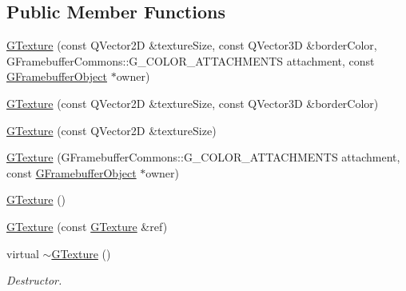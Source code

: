 \subsection*{Public Member Functions}
\begin{DoxyCompactItemize}
\item 
\mbox{\hyperlink{class_geometry_engine_1_1_geometry_buffer_1_1_g_texture_a1e4c62fd1d54f676f117ca11a90d55c5}{G\+Texture}} (const Q\+Vector2D \&texture\+Size, const Q\+Vector3D \&border\+Color, G\+Framebuffer\+Commons\+::\+G\+\_\+\+C\+O\+L\+O\+R\+\_\+\+A\+T\+T\+A\+C\+H\+M\+E\+N\+TS attachment, const \mbox{\hyperlink{class_geometry_engine_1_1_geometry_buffer_1_1_g_framebuffer_object}{G\+Framebuffer\+Object}} $\ast$owner)
\item 
\mbox{\hyperlink{class_geometry_engine_1_1_geometry_buffer_1_1_g_texture_a06caa47adf6c43699450c29212dab114}{G\+Texture}} (const Q\+Vector2D \&texture\+Size, const Q\+Vector3D \&border\+Color)
\item 
\mbox{\hyperlink{class_geometry_engine_1_1_geometry_buffer_1_1_g_texture_a8fa5f02d38154ba8642512e871a8edeb}{G\+Texture}} (const Q\+Vector2D \&texture\+Size)
\item 
\mbox{\hyperlink{class_geometry_engine_1_1_geometry_buffer_1_1_g_texture_add6fc3854f8fe8996fcd29de07d05646}{G\+Texture}} (G\+Framebuffer\+Commons\+::\+G\+\_\+\+C\+O\+L\+O\+R\+\_\+\+A\+T\+T\+A\+C\+H\+M\+E\+N\+TS attachment, const \mbox{\hyperlink{class_geometry_engine_1_1_geometry_buffer_1_1_g_framebuffer_object}{G\+Framebuffer\+Object}} $\ast$owner)
\item 
\mbox{\hyperlink{class_geometry_engine_1_1_geometry_buffer_1_1_g_texture_acfb10448d13cf57f11ed8a80b2a620dd}{G\+Texture}} ()
\item 
\mbox{\hyperlink{class_geometry_engine_1_1_geometry_buffer_1_1_g_texture_a6f0f5cdfdad0a20af7719c743375d678}{G\+Texture}} (const \mbox{\hyperlink{class_geometry_engine_1_1_geometry_buffer_1_1_g_texture}{G\+Texture}} \&ref)
\item 
\mbox{\label{class_geometry_engine_1_1_geometry_buffer_1_1_g_texture_a6ce58e552cc52873766aaa45b6075054}} 
virtual \mbox{\hyperlink{class_geometry_engine_1_1_geometry_buffer_1_1_g_texture_a6ce58e552cc52873766aaa45b6075054}{$\sim$\+G\+Texture}} ()
\begin{DoxyCompactList}\small\item\em Destructor. \end{DoxyCompactList}\item 

\end{DoxyCompactItemize}
